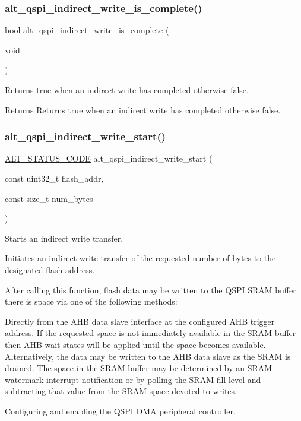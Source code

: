 \subsubsection{\texorpdfstring{alt\_qspi\_indirect\_write\_is\_complete()}{alt\_qspi\_indirect\_write\_is\_complete()}}
{\footnotesize\ttfamily bool alt\+\_\+qspi\+\_\+indirect\+\_\+write\+\_\+is\+\_\+complete (\begin{DoxyParamCaption}\item[{void}]{ }\end{DoxyParamCaption})}

Returns true when an indirect write has completed otherwise false.

\begin{DoxyReturn}{Returns}
Returns true when an indirect write has completed otherwise false. 
\end{DoxyReturn}
\mbox{\label{group__ALT__QSPI__INDAC_ga3c9283ecedcc1d04f06654c2db8d7e0d}} 
\subsubsection{\texorpdfstring{alt\_qspi\_indirect\_write\_start()}{alt\_qspi\_indirect\_write\_start()}}
{\footnotesize\ttfamily \mbox{\hyperlink{hwlib_8h_abdb0d369f069723ca55d6c94bcaaaa12}{A\+L\+T\+\_\+\+S\+T\+A\+T\+U\+S\+\_\+\+C\+O\+DE}} alt\+\_\+qspi\+\_\+indirect\+\_\+write\+\_\+start (\begin{DoxyParamCaption}\item[{const uint32\+\_\+t}]{flash\+\_\+addr,  }\item[{const size\+\_\+t}]{num\+\_\+bytes }\end{DoxyParamCaption})}

Starts an indirect write transfer.

Initiates an indirect write transfer of the requested number of bytes to the designated flash address.

After calling this function, flash data may be written to the Q\+S\+PI S\+R\+AM buffer there is space via one of the following methods\+:
\begin{DoxyItemize}
\item Directly from the A\+HB data slave interface at the configured A\+HB trigger address. If the requested space is not immediately available in the S\+R\+AM buffer then A\+HB wait states will be applied until the space becomes available. Alternatively, the data may be written to the A\+HB data slave as the S\+R\+AM is drained. The space in the S\+R\+AM buffer may be determined by an S\+R\+AM watermark interrupt notification or by polling the S\+R\+AM fill level and subtracting that value from the S\+R\+AM space devoted to writes.
\item Configuring and enabling the Q\+S\+PI D\+MA peripheral controller.
\end{DoxyItemize}

